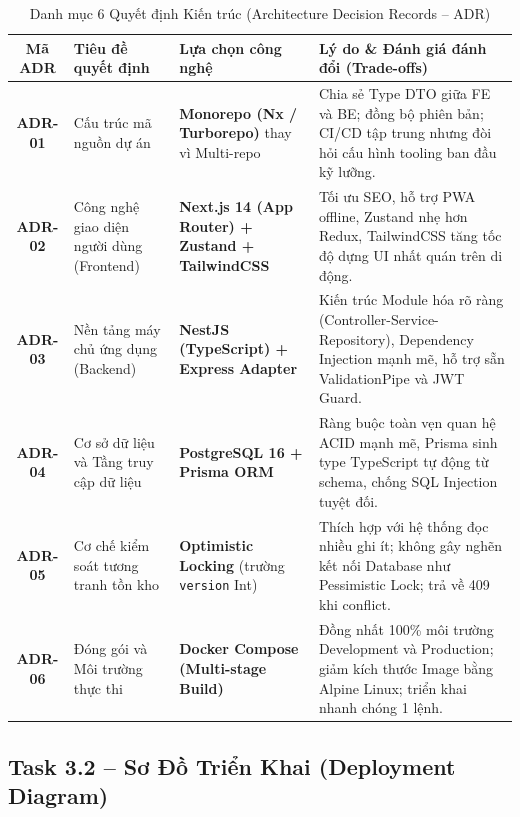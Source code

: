 \documentclass[11pt,a4paper]{article}
\begin{document}
\begin{table}[H]
\centering
\small
\renewcommand{\arraystretch}{0.92}
\begin{tabularx}{\linewidth}{|c|p{3.0cm}|p{3.2cm}|Y|}
\hline
{}
\textbf{Mã ADR} & \textbf{Tiêu đề quyết định} & \textbf{Lựa chọn công nghệ} & \textbf{Lý do \& Đánh giá đánh đổi (Trade-offs)} \\ \hline
\textbf{ADR-01} & Cấu trúc mã nguồn dự án & \textbf{Monorepo (Nx / Turborepo)} thay vì Multi-repo & Chia sẻ Type DTO giữa FE và BE; đồng bộ phiên bản; CI/CD tập trung nhưng đòi hỏi cấu hình tooling ban đầu kỹ lưỡng. \\ \hline
\textbf{ADR-02} & Công nghệ giao diện người dùng (Frontend) & \textbf{Next.js 14 (App Router) + Zustand + TailwindCSS} & Tối ưu SEO, hỗ trợ PWA offline, Zustand nhẹ hơn Redux, TailwindCSS tăng tốc độ dựng UI nhất quán trên di động. \\ \hline
\textbf{ADR-03} & Nền tảng máy chủ ứng dụng (Backend) & \textbf{NestJS (TypeScript) + Express Adapter} & Kiến trúc Module hóa rõ ràng (Controller-Service-Repository), Dependency Injection mạnh mẽ, hỗ trợ sẵn ValidationPipe và JWT Guard. \\ \hline
\textbf{ADR-04} & Cơ sở dữ liệu và Tầng truy cập dữ liệu & \textbf{PostgreSQL 16 + Prisma ORM} & Ràng buộc toàn vẹn quan hệ ACID mạnh mẽ, Prisma sinh type TypeScript tự động từ schema, chống SQL Injection tuyệt đối. \\ \hline
\textbf{ADR-05} & Cơ chế kiểm soát tương tranh tồn kho & \textbf{Optimistic Locking} (trường \texttt{version} Int) & Thích hợp với hệ thống đọc nhiều ghi ít; không gây nghẽn kết nối Database như Pessimistic Lock; trả về 409 khi conflict. \\ \hline
\textbf{ADR-06} & Đóng gói và Môi trường thực thi & \textbf{Docker Compose (Multi-stage Build)} & Đồng nhất 100\% môi trường Development và Production; giảm kích thước Image bằng Alpine Linux; triển khai nhanh chóng 1 lệnh. \\ \hline
\end{tabularx}
\caption{Danh mục 6 Quyết định Kiến trúc (Architecture Decision Records -- ADR)}
\label{tab:adr}
\end{table}
\clearpage

\subsection{Task 3.2 -- Sơ Đồ Triển Khai (Deployment Diagram)}
\end{document}
